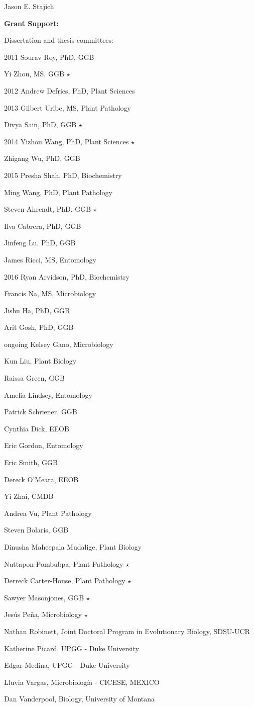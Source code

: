 \documentclass[10pt]{article}
\begin{document}
\begin{cv}{\centerline{Jason E. Stajich}}
\begin{cvlistcompact}{\bf Grant Support:}
\begin{cvlistcompact}{Dissertation and thesis committees:}
\item [2011] Sourav Roy, PhD, GGB
\item Yi Zhou, MS, GGB $\star$
\item [2012] Andrew Defries, PhD, Plant Sciences
\item [2013] Gilbert Uribe, MS, Plant Pathology
\item Divya Sain, PhD, GGB $\star$
\item [2014] Yizhou Wang, PhD, Plant Sciences $\star$
\item Zhigang Wu, PhD, GGB
\item [2015] Presha Shah, PhD, Biochemistry
\item Ming Wang, PhD, Plant Pathology
\item Steven Ahrendt, PhD, GGB $\star$
\item Ilva Cabrera, PhD, GGB
\item Jinfeng Lu, PhD, GGB
\item James Ricci, MS, Entomology
\item [2016] Ryan Arvidson, PhD, Biochemistry
\item Francis Na, MS, Microbiology
\item Jishu Ha, PhD, GGB
\item Arit Gosh, PhD, GGB
\item [ongoing] Kelsey Gano, Microbiology
\item Kun Liu, Plant Biology
\item Raissa Green, GGB
\item Amelia Lindsey, Entomology
\item Patrick Schriener, GGB
\item Cynthia Dick, EEOB
\item Eric Gordon, Entomology
\item Eric Smith, GGB
\item Dereck O'Meara, EEOB
\item Yi Zhai, CMDB
\item Andrea Vu, Plant Pathology
\item Steven Bolaris, GGB
\item Dinusha Maheepala Mudalige, Plant Biology
\item Nuttapon Pombubpa, Plant Pathology $\star$
\item Derreck Carter-House, Plant Pathology $\star$
\item Sawyer Masonjones, GGB $\star$
\item Jes\'{u}s Pe\~{n}a, Microbiology $\star$
\item Nathan Robinett, Joint Doctoral Program in Evolutionary Biology, SDSU-UCR
\item Katherine Picard, UPGG - Duke University
\item Edgar Medina, UPGG - Duke University
\item Lluvia Vargas, Microbiolog\'{i}a - CICESE, MEXICO
\item Dan Vanderpool, Biology, University of Montana
\end{cvlistcompact}


\end{cvlistcompact}
\end{cv}
\end{document}
